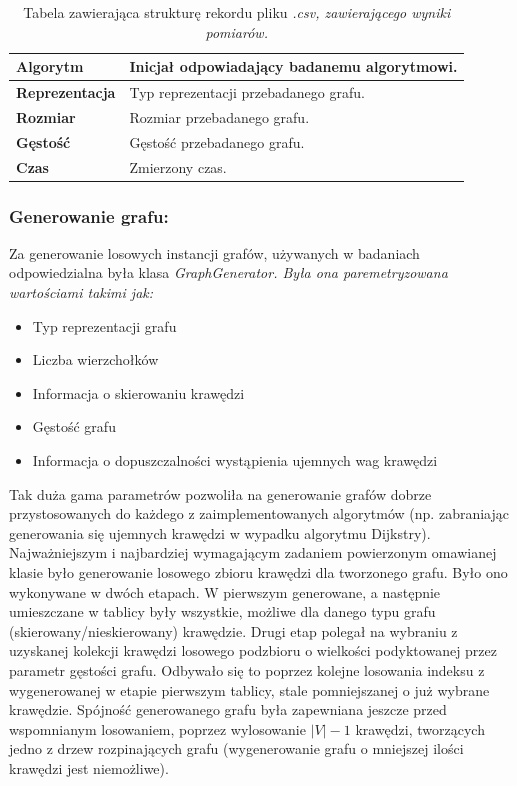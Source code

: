 \documentclass[a4paper,12pt]{article}
\begin{document}
\begin{table}[H]
	\centering
	\label{tab.wynik-pomairu}
	\caption{\centering Tabela zawierająca strukturę rekordu pliku \it *.csv\rm, zawierającego wyniki pomiarów.}
	\begin{tabular}{|l|l|}
		\hline
		\textbf{Algorytm}      & Inicjał odpowiadający badanemu algorytmowi. \\ \hline
		\textbf{Reprezentacja} & Typ reprezentacji przebadanego grafu.       \\ \hline
		\textbf{Rozmiar}       & Rozmiar przebadanego grafu.                 \\ \hline
		\textbf{Gęstość}       & Gęstość przebadanego grafu.                 \\ \hline
		\textbf{Czas}          & Zmierzony czas.                             \\ \hline
	\end{tabular}
\end{table}

\subsubsection{Generowanie grafu:}
Za generowanie losowych instancji grafów, używanych w badaniach odpowiedzialna była klasa \it GraphGenerator\rm. Była ona paremetryzowana wartościami takimi jak:
\begin{itemize}
	\item Typ reprezentacji grafu
	\item Liczba wierzchołków
	\item Informacja o skierowaniu krawędzi
	\item Gęstość grafu
	\item Informacja o dopuszczalności wystąpienia ujemnych wag krawędzi
\end{itemize}
\vspace{5mm}

\noindent
Tak duża gama parametrów pozwoliła na generowanie grafów dobrze przystosowanych do każdego z zaimplementowanych algorytmów (np. zabraniając generowania się ujemnych krawędzi w wypadku algorytmu Dijkstry).\\

\noindent
Najważniejszym i najbardziej wymagającym zadaniem powierzonym omawianej klasie było generowanie losowego zbioru krawędzi dla tworzonego grafu. Było ono wykonywane w dwóch etapach. W pierwszym generowane, a następnie umieszczane w tablicy były wszystkie, możliwe dla danego typu grafu (skierowany/nieskierowany) krawędzie. Drugi etap polegał na wybraniu z uzyskanej kolekcji krawędzi losowego podzbioru o wielkości podyktowanej przez parametr gęstości grafu. Odbywało się to poprzez kolejne losowania indeksu z wygenerowanej w etapie pierwszym tablicy, stale pomniejszanej o już wybrane krawędzie. Spójność generowanego grafu była zapewniana jeszcze przed wspomnianym losowaniem, poprzez wylosowanie $|V|-1$ krawędzi, tworzących jedno z drzew rozpinających grafu (wygenerowanie grafu o mniejszej ilości krawędzi jest niemożliwe).
\end{document}
